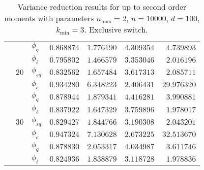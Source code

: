 \begin{table}[htb]
{\begin{tabular}{l@{\hskip 12pt}l@{\hskip 12pt}l@{\hskip 12pt}r@{\hskip 12pt}r@{\hskip 12pt}r@{\hskip 12pt}r}
            &    &$\phi_{q}$ &  $0.868874$ &  $1.776190$ &    $4.309354$ &   $4.739893$ \\
            &    & $\phi_{\ell}$ &  $0.795802$ &  $1.466579$ &    $3.353046$ &   $2.016196$ \\\cmidrule{2-7}
            & $20$ &$\phi_{sq}$ &  $0.832562$ &  $1.657484$ &    $3.617313$ &   $2.085711$ \\
            &    &$\phi_{c}$ &  $0.934280$ &  $6.348223$ &    $2.406431$ &  $29.976320$ \\
            &    &$\phi_{q}$ &  $0.878944$ &  $1.879341$ &    $4.416281$ &   $3.990881$ \\
            &    & $\phi_{\ell}$ &  $0.837922$ &  $1.647329$ &    $3.759896$ &   $1.978017$ \\\cmidrule{2-7}
            & $30$ &$\phi_{sq}$ &  $0.829427$ &  $1.844766$ &    $3.190308$ &   $2.043201$ \\
            &    &$\phi_{c}$ &  $0.947324$ &  $7.130628$ &    $2.673225$ &  $32.513670$ \\
            &    &$\phi_{q}$ &  $0.878830$ &  $2.053317$ &    $4.034987$ &   $3.611746$ \\
            &    & $\phi_{\ell}$ &  $0.824936$ &  $1.838879$ &    $3.118728$ &   $1.978836$ \\
\bottomrule
\end{tabular}}
    \caption[Variance reduction results for up to second order moments]{Variance reduction results for up to second order moments with parameters $n_{\max}=2$, $n=\num{10000}$, $d=100$, $k_{\min}=3$. Exclusive switch.}
    \label{tab:eff2}
\end{table}

